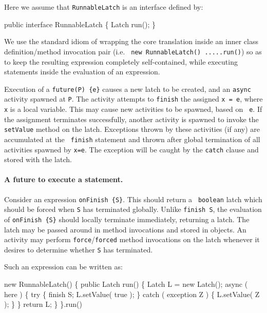 {{Here we assume that {\tt RunnableLatch} is an interface defined by:
\begin{x10} 
  public interface RunnableLatch \{
     Latch run();
  \}
\end{x10}

We use the standard \java{} idiom of wrapping the core translation
inside an inner class definition/method invocation pair (i.e.{} {\tt
new RunnableLatch() {....}.run()}) so as to keep the resulting
expression completely self-contained, while executing statements
inside the evaluation of an expression.

Execution of a {\tt future(P) \{e\}} causes a new latch to be created,
and an {\tt async} activity spawned at {\tt P}. The activity attempts
to {\tt finish} the assigned {\tt x = e}, where {\tt x} is a local
variable.  This may cause new activities to be spawned, based on {\tt
e}. If the assignment terminates successfully, another activity is
spawned to invoke the {\tt setValue} method on the latch.  Exceptions
thrown by these activities (if any) are accumulated at the {\tt
finish} statement and thrown after global termination of all
activities spawned by {\tt x=e}. The exception will be caught by the 
{\tt catch} clause and stored with the latch. 



\paragraph{A future to execute a statement.}
Consider an expression {\tt onFinish \{S\}}. This should return a {\tt
boolean} latch which should be forced when {\tt S} has terminated
globally. Unlike {\tt finish S}, the evaluation of {\tt onFinish
\{S\}} should locally terminate immediately, returning a latch. The
latch may be passed around in method invocations and stored in
objects. An activity may perform {\tt force}/{\tt forced} method
invocations on the latch whenever it desires to determine whether {\tt S}
has terminated.

Such an expression can be written as:
\begin{x10}
  new RunnableLatch() \{
      public Latch run() \{
         Latch L = new Latch();
         async ( here ) \{
            try \{
                finish S;
                L.setValue( true );
            \} catch ( exception Z ) \{
                 L.setValue( Z );
            \}
         \}
         return L;
      \}
    \}.run()
\end{x10}

}}
